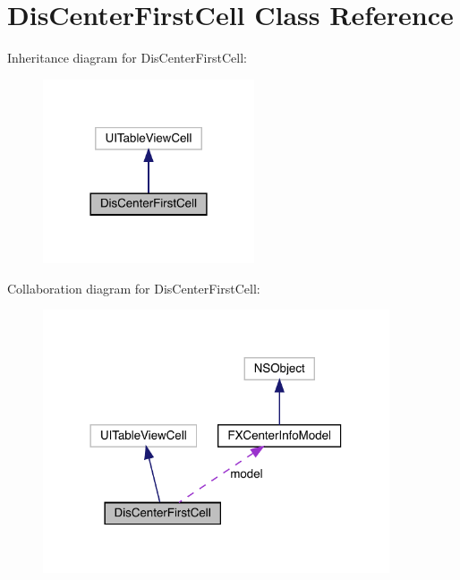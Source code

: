 \hypertarget{interface_dis_center_first_cell}{}\section{Dis\+Center\+First\+Cell Class Reference}
\label{interface_dis_center_first_cell}


Inheritance diagram for Dis\+Center\+First\+Cell\+:\nopagebreak
\begin{figure}[H]
\begin{center}
\leavevmode
\includegraphics[width=177pt]{interface_dis_center_first_cell__inherit__graph}
\end{center}
\end{figure}


Collaboration diagram for Dis\+Center\+First\+Cell\+:\nopagebreak
\begin{figure}[H]
\begin{center}
\leavevmode
\includegraphics[width=290pt]{interface_dis_center_first_cell__coll__graph}
\end{center}
\end{figure}
